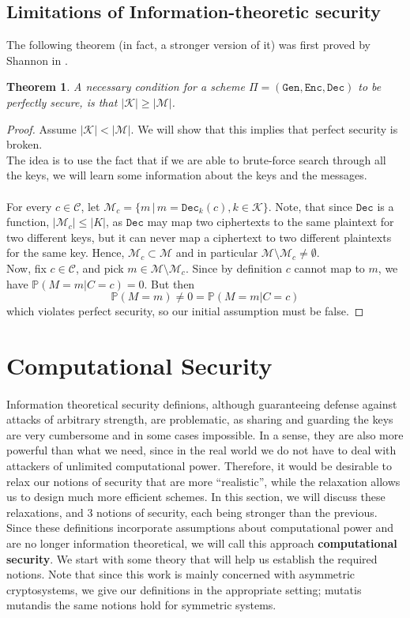 \documentclass{article}
\newtheorem{theorem}{Theorem}[section]
\theoremstyle{definition}
\theoremstyle{example}
\newcommand{\Enc}{\texttt{Enc}}
\newcommand{\Dec}{\texttt{Dec}}
\newcommand{\Gen}{\texttt{Gen}}
\newcommand{\M}{\mathcal{M}}
\renewcommand{\C}{\mathcal{C}}
\newcommand{\K}{\mathcal{K}}
\newcommand{\Prob}{\mathbb{P}}
\begin{document}
\subsection{Limitations of Information-theoretic security}
The following theorem (in fact, a stronger version of it) was first proved by
Shannon in \cite{shannon1949communication}.
\begin{theorem}
A necessary condition for a scheme $\Pi = (\Gen, \Enc, \Dec)$ to be perfectly secure, is that $|\K|
\geq |\M|$.
\end{theorem}
\begin{proof}
  Assume $|\K| < |\M|$. We will show that this implies that perfect security is broken.\\
  The idea is to use the fact that if we are able to brute-force search through
  all the keys, we will learn some information about the keys and the messages.
  \paragraph{}
  For every $c \in \C$, let $\M_c = \{m \,|\, m = \Dec_k(c), k \in \K\}$.
  Note, that since $\Dec$ is a function, $|\M_c| \leq |K|$, as $\Dec$ may map two ciphertexts
  to the same plaintext for two different keys, but it can never map a
  ciphertext to two different plaintexts for the same key. Hence, $\M_c \subset
  \M$ and in particular $\M \setminus \M_c \neq \emptyset$.\\
  Now, fix $c \in \C$, and pick $m \in \M \setminus \M_c$. Since by definition
  $c$ cannot map to $m$, we have $\Prob(M=m | C = c) = 0$. But then
  \[
    \Prob(M=m) \neq 0 = \Prob(M=m | C=c)
  \]
  which violates perfect security, so our initial assumption must be false.
\end{proof}
\section{Computational Security}
\paragraph{}
Information theoretical security definions, although guaranteeing defense
against attacks of arbitrary strength, are problematic, as sharing and guarding
the keys are very cumbersome and in some cases impossible. In a sense, they are
also more powerful than what we need, since in the real world we do not have to
deal with attackers of unlimited computational power. Therefore, it would be
desirable to relax our notions of security that are more ``realistic'', while
the relaxation allows us to design much more efficient schemes.
In this section, we will discuss these relaxations, and 3 notions of security,
each being stronger than the previous. Since these definitions incorporate
assumptions about computational power and are no longer information theoretical,
we will call this approach \textbf{computational security}. We start with some
theory that will help us establish the required notions. Note that since this
work is mainly concerned with asymmetric cryptosystems, we give our definitions
in the appropriate setting; mutatis mutandis the same notions hold for symmetric systems.
\end{document}
